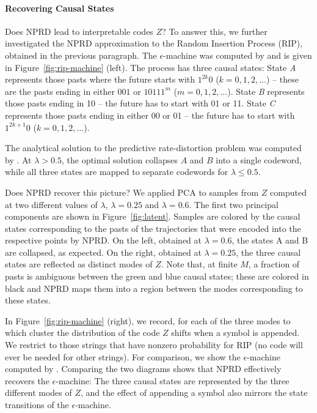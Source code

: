 \documentclass[entropy,article,submit,moreauthors,pdftex,10pt,a4paper]{Definitions/mdpi}
\begin{document}
\paragraph{Recovering Causal States}
Does NPRD lead to interpretable codes $Z$?
To answer this, we further investigated the NPRD approximation to the Random Insertion Process (RIP), obtained in the previous paragraph.
The $\epsilon$-machine was computed by  \cite{marzen-predictive-2016} and is given in Figure~\ref{fig:rip-machine} (left).
The process has three causal states:
State \textit{A} represents those pasts where the future starts with $1^{2k}0$ ($k = 0, 1, 2, \dots$) -- these are the pasts ending in either $001$ or $10111^m$ ($m= 0, 1, 2, \dots$). %
State \textit{B} represents those pasts ending in 10 -- the future has to start with 01 or 11.
State \textit{C} represents those pasts ending in either 00 or 01 -- the future has to start with $1^{2k+1}0$ ($k = 0, 1, 2, \dots$).

The analytical solution to the predictive rate-distortion problem was computed by \cite{marzen-predictive-2016}.
At $\lambda > 0.5$, the optimal solution collapses $A$ and $B$ into a single codeword, while all three states are mapped to separate codewords for $\lambda \leq 0.5$.


Does NPRD recover this picture?
We applied PCA to samples from $Z$ computed at two different values of $\lambda$, $\lambda = 0.25$ and $\lambda = 0.6$. %
The first two principal components are shown in Figure~\ref{fig:latent}.
Samples are colored by the causal states corresponding to the pasts of the trajectories that were encoded into the respective points by NPRD.
On the left, obtained at $\lambda=0.6$, the states A and B are collapsed, as expected.
On the right, obtained at $\lambda=0.25$, the three causal states are reflected as distinct modes of $Z$.
Note that, at finite $M$, a fraction of pasts is ambiguous between the green and blue causal states; these are colored in black and NPRD maps them into a region between the modes corresponding to these states.

In Figure~\ref{fig:rip-machine} (right), we record, for each of the three modes to which cluster the distribution of the code $Z$ shifts when a symbol is appended.
We restrict to those strings that have nonzero probability for RIP (no code will ever be needed for other strings).
For comparison, we show the $\epsilon$-machine computed by \cite{marzen-predictive-2016}.
Comparing the two diagrams shows that NPRD effectively recovers the $\epsilon$-machine:
The three causal states are represented by the three different modes of $Z$, and the effect of appending a symbol also mirrors the state transitions of the $\epsilon$-machine.
\end{document}
